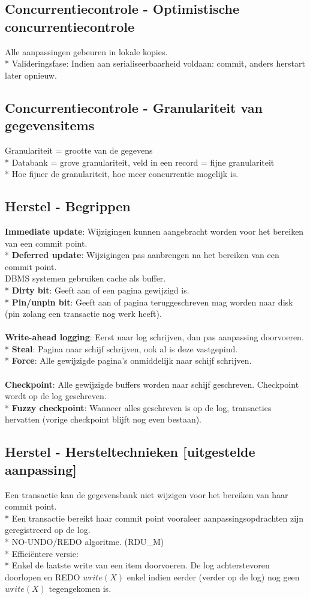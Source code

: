 \documentclass[10pt]{article}
\begin{document}
\subsection{Concurrentiecontrole - Optimistische concurrentiecontrole}
Alle aanpassingen gebeuren in lokale kopies.\\*
Valideringsfase: Indien aan serialiseerbaarheid voldaan: commit, anders herstart later opnieuw.
\subsection{Concurrentiecontrole - Granulariteit van gegevensitems}
Granulariteit = grootte van de gegevens\\*
Databank = grove granulariteit, veld in een record = fijne granulariteit\\*
Hoe fijner de granulariteit, hoe meer concurrentie mogelijk is.
\subsection{Herstel - Begrippen}
\textbf{Immediate update}: Wijzigingen kunnen aangebracht worden voor het bereiken van een commit point.\\*
\textbf{Deferred update}: Wijzigingen pas aanbrengen na het bereiken van een commit point.\\
DBMS systemen gebruiken cache als buffer.\\*
\textbf{Dirty bit}: Geeft aan of een pagina gewijzigd is.\\*
\textbf{Pin/unpin bit}: Geeft aan of pagina teruggeschreven mag worden naar disk (pin zolang een transactie nog werk heeft).\\\\
\textbf{Write-ahead logging}: Eerst naar log schrijven, dan pas aanpassing doorvoeren.\\*
\textbf{Steal}: Pagina naar schijf schrijven, ook al is deze vastgepind.\\*
\textbf{Force}: Alle gewijzigde pagina's onmiddelijk naar schijf schrijven.\\\\
\textbf{Checkpoint}: Alle gewijzigde buffers worden naar schijf geschreven. Checkpoint wordt op de log geschreven.\\*
\textbf{Fuzzy checkpoint}: Wanneer alles geschreven is op de log, transacties hervatten (vorige checkpoint blijft nog even bestaan).
\subsection{Herstel - Hersteltechnieken [uitgestelde aanpassing]}
Een transactie kan de gegevensbank niet wijzigen voor het bereiken van haar commit point.\\*
Een transactie bereikt haar commit point vooraleer aanpassingsopdrachten zijn geregistreerd op de log.\\*
NO-UNDO/REDO algoritme. (RDU\_M)\\*
Effici\"entere versie:\\*
Enkel de laatste write van een item doorvoeren. De log achterstevoren doorlopen en REDO $write(X)$ enkel indien eerder (verder op de log) nog geen $write(X)$ tegengekomen is.
\end{document}
